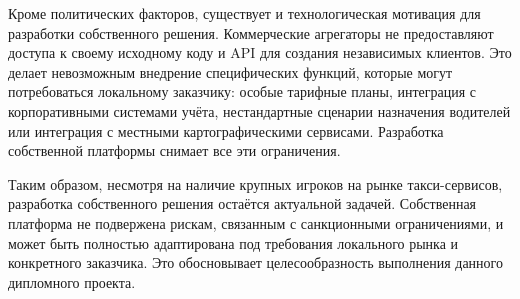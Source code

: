 {		\par \redline Кроме политических факторов, существует и технологическая мотивация для разработки собственного решения. Коммерческие агрегаторы не предоставляют доступа к своему исходному коду и API для создания независимых клиентов. Это делает невозможным внедрение специфических функций, которые могут потребоваться локальному заказчику: особые тарифные планы, интеграция с корпоративными системами учёта, нестандартные сценарии назначения водителей или интеграция с местными картографическими сервисами. Разработка собственной платформы снимает все эти ограничения.
		
		\par \redline Таким образом, несмотря на наличие крупных игроков на рынке такси-сервисов, разработка собственного решения остаётся актуальной задачей. Собственная платформа не подвержена рискам, связанным с санкционными ограничениями, и может быть полностью адаптирована под требования локального рынка и конкретного заказчика. Это обосновывает целесообразность выполнения данного дипломного проекта.
		
		\par
	}
	
	\setcounter{subchaptercntr}{1}
	\setcounter{imagecntr}{1}
